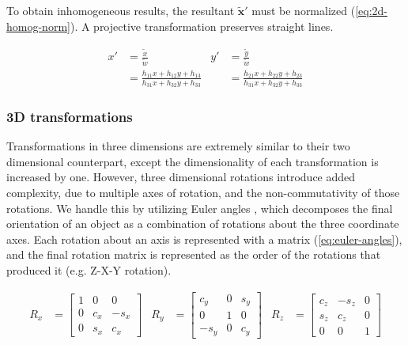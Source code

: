 To obtain inhomogeneous results, the resultant $\tilde{\mathbf{x}}'$ must be normalized (\cref{eq:2d-homog-norm}). A projective transformation preserves straight lines.

\begin{equation}
    \begin{aligned}
        x'&= \frac{\tilde{x}}{\tilde{w}}  &  y' &= \frac{\tilde{y}}{\tilde{w}}\\
        &= \frac{h_{11}x + h_{12}y + h_{13}}{h_{31}x + h_{32}y + h_{33}} &  &= \frac{h_{21}x + h_{22}y + h_{23}}{h_{31}x + h_{32}y + h_{33}}
    \end{aligned}
    \label{eq:2d-homog-norm}
\end{equation}


\subsubsection{3D transformations}
\label{sec:3d-transformations}
Transformations in three dimensions are extremely similar to their two dimensional counterpart, except the dimensionality of each transformation is increased by one. However, three dimensional rotations introduce added complexity, due to multiple axes of rotation, and the non-commutativity of those rotations. We handle this by utilizing Euler angles \cite{groodJointCoordinateSystem1983}, which decomposes the final orientation of an object as a combination of rotations about the three coordinate axes. Each rotation about an axis is represented with a matrix (\cref{eq:euler-angles}), and the final rotation matrix is represented as the order of the rotations that produced it (e.g. Z-X-Y rotation).

\begin{equation}
    \begin{aligned}
        R_{x} &= \begin{bmatrix}
            1 & 0 & 0 \\ 0 & c_x & -s_x \\ 0 & s_x & c_x
        \end{bmatrix}
        &R_{y} &= \begin{bmatrix}
            c_y & 0 & s_y \\ 0 & 1 & 0 \\ -s_y & 0 & c_y
        \end{bmatrix}
        &R_{z} &= \begin{bmatrix}
            c_z & -s_z & 0 \\ s_z & c_z & 0 \\ 0 & 0 & 1
        \end{bmatrix} \\
    \end{aligned}
    \label{eq:euler-angles}
\end{equation}

